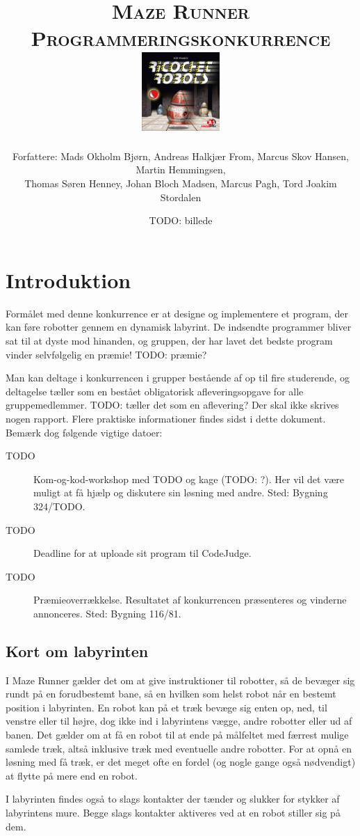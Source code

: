 \documentclass[10pt, a4paper]{article}
\title{\textsc{\Huge Maze Runner}\\\textsc{Programmeringskonkurrence}\\[0.25cm]\includegraphics[height=3cm]{img/boxart.jpg}}
\date{TODO: billede}
\author{{\small Forfattere:
    Mads Okholm Bjørn,
    Andreas Halkjær From,
    Marcus Skov Hansen,
    Martin Hemmingsen,
  }\\{\small
    Thomas Søren Henney,
    Johan Bloch Madsen,
    Marcus Pagh,
    Tord Joakim Stordalen
}}
\begin{document}
\maketitle

\section{Introduktion}
Formålet med denne konkurrence er at designe og implementere et program, der kan føre robotter gennem en dynamisk labyrint.
De indsendte programmer bliver sat til at dyste mod hinanden, og gruppen, der har lavet det bedste program vinder selvfølgelig en præmie! TODO: præmie?

Man kan deltage i konkurrencen i grupper bestående af op til fire studerende, og deltagelse tæller som en bestået obligatorisk afleveringsopgave for alle gruppemedlemmer. TODO: tæller det som en aflevering?
Der skal ikke skrives nogen rapport.
Flere praktiske informationer findes sidst i dette dokument.
Bemærk dog følgende vigtige datoer:

\begin{description}
\item [TODO] Kom-og-kod-workshop med TODO og kage (TODO: ?). Her vil det være muligt at få hjælp og diskutere sin løsning med andre. Sted: Bygning 324/TODO.
\item [TODO] Deadline for at uploade sit program til CodeJudge.
\item [TODO] Præmieoverrækkelse. Resultatet af konkurrencen præsenteres og vinderne annonceres. Sted: Bygning 116/81.
\end{description}

\subsection{Kort om labyrinten}
I Maze Runner gælder det om at give instruktioner til robotter, så de bevæger sig rundt på en forudbestemt bane, så en hvilken som helst robot når en bestemt position i labyrinten.
En robot kan på et træk bevæge sig enten op, ned, til venstre eller til højre, dog ikke ind i labyrintens vægge, andre robotter eller ud af banen.
Det gælder om at få en robot til at ende på målfeltet med færrest mulige samlede træk, altså inklusive træk med eventuelle andre robotter.
For at opnå en løsning med få træk, er det meget ofte en fordel (og nogle gange også nødvendigt) at flytte på mere end en robot.

I labyrinten findes også to slags kontakter der tænder og slukker for stykker af labyrintens mure.
Begge slags kontakter aktiveres ved at en robot stiller sig på dem.
\end{document}
